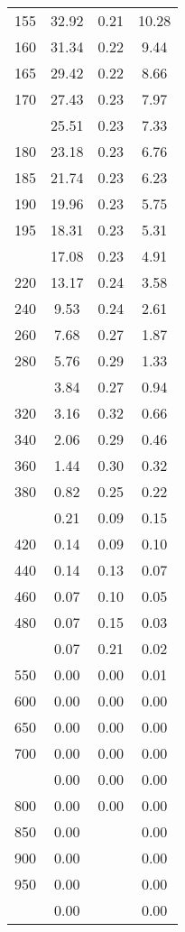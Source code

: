 \begin{table}[ht]
\begin{tabular}{lccc}
  155 & 32.92 & 0.21 & 10.28 \\ 
  160 & 31.34 & 0.22 & 9.44 \\ 
  165 & 29.42 & 0.22 & 8.66 \\ 
  170 & 27.43 & 0.23 & 7.97 \\ 
   \addlinespace
175 & 25.51 & 0.23 & 7.33 \\ 
  180 & 23.18 & 0.23 & 6.76 \\ 
  185 & 21.74 & 0.23 & 6.23 \\ 
  190 & 19.96 & 0.23 & 5.75 \\ 
  195 & 18.31 & 0.23 & 5.31 \\ 
   \addlinespace
200 & 17.08 & 0.23 & 4.91 \\ 
  220 & 13.17 & 0.24 & 3.58 \\ 
  240 & 9.53 & 0.24 & 2.61 \\ 
  260 & 7.68 & 0.27 & 1.87 \\ 
  280 & 5.76 & 0.29 & 1.33 \\ 
   \addlinespace
300 & 3.84 & 0.27 & 0.94 \\ 
  320 & 3.16 & 0.32 & 0.66 \\ 
  340 & 2.06 & 0.29 & 0.46 \\ 
  360 & 1.44 & 0.30 & 0.32 \\ 
  380 & 0.82 & 0.25 & 0.22 \\ 
   \addlinespace
400 & 0.21 & 0.09 & 0.15 \\ 
  420 & 0.14 & 0.09 & 0.10 \\ 
  440 & 0.14 & 0.13 & 0.07 \\ 
  460 & 0.07 & 0.10 & 0.05 \\ 
  480 & 0.07 & 0.15 & 0.03 \\ 
   \addlinespace
500 & 0.07 & 0.21 & 0.02 \\ 
  550 & 0.00 & 0.00 & 0.01 \\ 
  600 & 0.00 & 0.00 & 0.00 \\ 
  650 & 0.00 & 0.00 & 0.00 \\ 
  700 & 0.00 & 0.00 & 0.00 \\ 
   \addlinespace
750 & 0.00 & 0.00 & 0.00 \\ 
  800 & 0.00 & 0.00 & 0.00 \\ 
  850 & 0.00 &  & 0.00 \\ 
  900 & 0.00 &  & 0.00 \\ 
  950 & 0.00 &  & 0.00 \\ 
   \addlinespace
1000 & 0.00 &  & 0.00 \\ 
   \bottomrule
\end{tabular}
\end{table}
